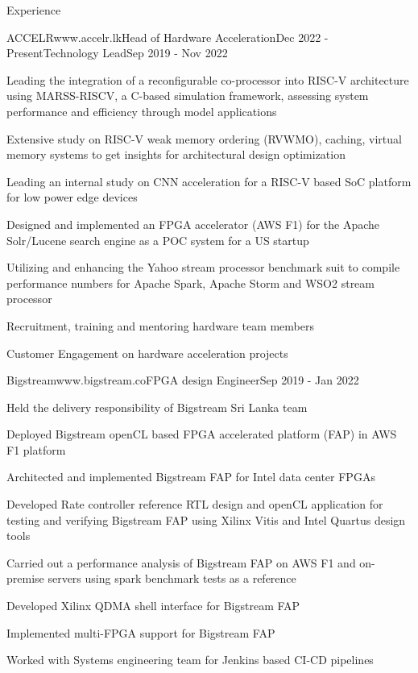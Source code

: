 \documentclass[
11pt, %
]{./assets/resume} %
\begin{document}
\begin{rSection}{Experience}
	\begin{rSubsectionM}{ACCELR}{www.accelr.lk}{Head of Hardware Acceleration}{Dec 2022 - Present}{Technology Lead}{Sep 2019 - Nov 2022}{}{}
		\item Leading the integration of a reconfigurable co-processor into RISC-V architecture using MARSS-RISCV, a C-based simulation framework, assessing system performance and efficiency through model applications
		\item Extensive study on RISC-V weak memory ordering (RVWMO), caching, virtual memory systems to get insights for architectural design optimization
		\item Leading an internal study on CNN acceleration for a RISC-V based SoC platform for low power edge devices
		\item Designed and implemented an FPGA accelerator (AWS F1) for the Apache Solr/Lucene search engine as a POC system for a US startup
		\item Utilizing and enhancing the Yahoo stream processor benchmark suit to compile performance numbers for  Apache Spark, Apache Storm and WSO2 stream processor
		\item Recruitment, training and mentoring hardware team members
		\item Customer Engagement on hardware acceleration projects
	\end{rSubsectionM}
	\begin{rSubsectionX}{Bigstream}{www.bigstream.co}{FPGA design Engineer}{Sep 2019 - Jan 2022}
		\item Held the delivery responsibility of Bigstream Sri Lanka team
		\item Deployed Bigstream openCL based FPGA accelerated platform (FAP) in AWS F1 platform
		\item Architected and implemented Bigstream FAP for Intel data center FPGAs
		\item Developed Rate controller reference RTL design and openCL application for testing and verifying Bigstream FAP using Xilinx Vitis and Intel Quartus design tools
		\item Carried out a performance analysis of Bigstream FAP on AWS F1 and on-premise servers using spark benchmark tests as a reference
		\item Developed Xilinx QDMA shell interface for Bigstream FAP
		\item Implemented multi-FPGA support for Bigstream FAP
		\item Worked with Systems engineering team for Jenkins based CI-CD pipelines

\end{rSubsectionX}
\end{rSection}
\end{document}

